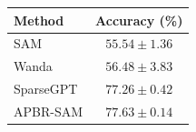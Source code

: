 \begin{tabular}{lc}
\toprule
Method & Accuracy (\%) \\
\midrule
SAM & $55.54\pm1.36$ \\
Wanda & $56.48\pm3.83$ \\
SparseGPT & $77.26\pm0.42$ \\
APBR-SAM & $\mathbf{77.63\pm0.14}$ \\
\bottomrule
\end{tabular}
